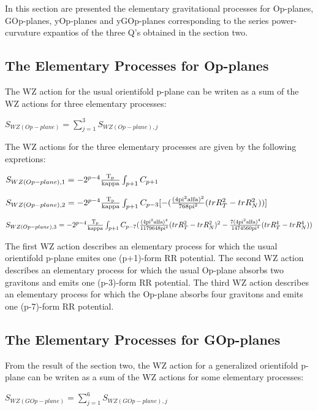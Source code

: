 \documentclass[a4paper,a4paper]{article}
\begin{document}
In this section are presented the elementary gravitational processes for Op-planes, GOp-planes, yOp-planes and yGOp-planes corresponding to the series power-curvature expantios of the three Q's obtained in the section two.
\subsection{The Elementary Processes for Op-planes }
The WZ action for the usual orientifold p-plane can be writen as a sum of the WZ actions for three elementary processes:

\begin{center}
{  $ S_{WZ(Op-plane)} = \sum_{j=1}^{3}S_{WZ(Op-plane),j} $ }
\end{center}
The WZ actions for the three elementary processes are given by the following 
expretions:
\begin{center}
{  $ S_{WZ(Op-plane),1} = -2^{p-4}\frac{\rm T_p}{\rm kappa}\int_{p+1} C_{p+1}$ }
\end{center} 
\begin{center}
{  $ S_{WZ(Op-plane),2} = -2^{p-4}\frac{\rm T_p}{\rm kappa}\int_{p+1} C_{p-3}[-({\frac{\rm(4pi^2alfa)^2 }{\rm 768pi^2}}{(trR_T^2- trR_N^2)})]$ }
\end{center}
\begin{center}
{  $ S_{WZ(Op-plane),3} = -2^{p-4}\frac{\rm T_p}{\rm kappa}\int_{p+1} C_{p-7}(\frac{\rm (4pi^2alfa)^4}{\rm 1179648pi^4}{{(trR_T^2- trR_N^2)^2}}-\frac{\rm 7(4pi^2alfa)^4}{\rm 1474560pi^4}{(trR_T^4- trR_N^4)})$ }
\end{center}
The first WZ action describes an elementary process for which the usual orientifold p-plane emites one (p+1)-form RR potential.
The second WZ action describes an elementary process for which the usual
Op-plane absorbs two gravitons and emits one (p-3)-form RR potential.
The third WZ action describes an elementary process for which the Op-plane absorbs four gravitons and emits one (p-7)-form RR potential.
\subsection{The Elementary Processes for GOp-planes } 
From the result of the section two, the WZ action for a generalized orientifold p-plane can be writen as a sum of the WZ actions for some elementary processes:
\begin{center}
{  $ S_{WZ(GOp-plane)} = \sum_{j=1}^{6}S_{WZ(GOp-plane),j} $ }
\end{center}
\end{document}
